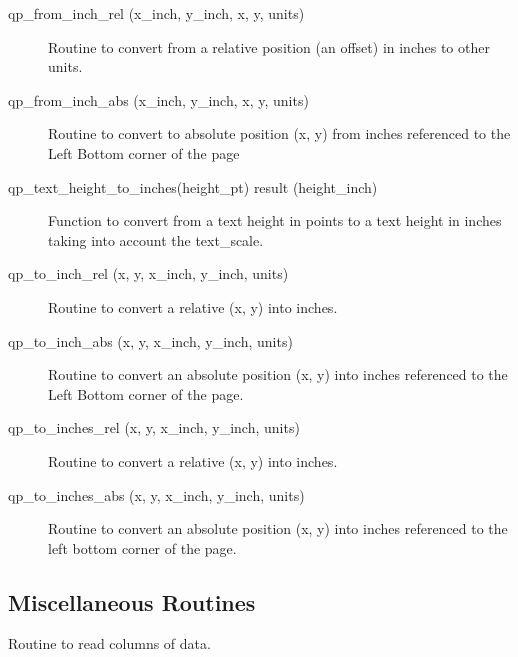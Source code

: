 \begin{description}

\label{r:qp.from.inch.rel}
\item[qp_from_inch_rel (x_inch, y_inch, x, y, units)] \Newline 
     Routine to convert from a relative position (an offset) in inches
     to other units.

\label{r:qp.from.inch.abs}
\item[qp_from_inch_abs (x_inch, y_inch, x, y, units)] \Newline 
     Routine to convert to absolute position (x, y) from inches referenced
     to the Left Bottom corner of the page

\label{r:qp.text.height.to.inches}
\item[qp_text_height_to_inches(height_pt) result (height_inch)] \Newline 
Function to convert from a text height in points to a text height in
inches taking into account the text_scale.

\label{r:qp.to.inch.rel}
\item[qp_to_inch_rel (x, y, x_inch, y_inch, units)] \Newline 
Routine to convert a relative (x, y) into inches.

\label{r:qp.to.inch.abs}
\item[qp_to_inch_abs (x, y, x_inch, y_inch, units)] \Newline 
Routine to convert an absolute position (x, y) into inches referenced
to the Left Bottom corner of the page.

\label{r:qp.to.inches.rel}
\item[qp_to_inches_rel (x, y, x_inch, y_inch, units)] \Newline 
     Routine to convert a relative (x, y) into inches.

\label{r:qp.to.inches.abs}
\item[qp_to_inches_abs (x, y, x_inch, y_inch, units)] \Newline 
     Routine to convert an absolute position (x, y) into inches referenced
     to the left bottom corner of the page.

\end{description}

\subsection{Miscellaneous Routines}

\begin{description}

\label{r:qp.read.data}
\item[qp_read_data (iu, err_flag, x, ix_col, y, iy_col, z, iz_col, 
                                                               t, it_col)] \Newline 
     Routine to read columns of data.

\end{description}

